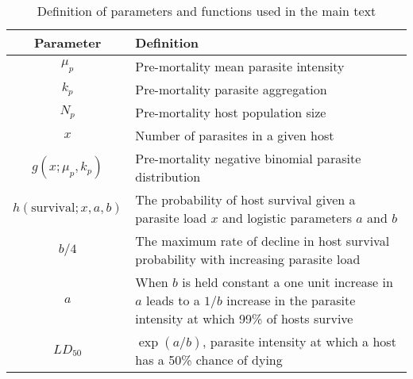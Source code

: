 \documentclass[12pt, a4paper]{article}
\begin{document}
\begin{table}
    \centering
    \caption{Definition of parameters and functions used in the main text}
    \begin{tabular}{c p{12cm}}
    \hline
    Parameter & Definition \\
    \hline\hline
    $\mu_p$ & Pre-mortality mean parasite intensity \\
    $k_p$   & Pre-mortality parasite aggregation \\
    $N_p$   & Pre-mortality host population size \\
    $x$     & Number of parasites in a given host \\
    $g(x; \mu_p, k_p)$ & Pre-mortality negative binomial parasite distribution \\

    $h(\text{survival}; x, a, b)$ & The probability of host survival given a parasite load $x$ and logistic parameters $a$ and $b$\\

    $b / 4$ & The maximum rate of decline in host survival probability with increasing parasite load  \\
    $a$ & When $b$ is held constant a one unit increase in $a$ leads to a $1 / b$ increase in the parasite intensity at which 99\% of hosts survive\\
    $LD_{50}$ & $\exp(a / b)$, parasite intensity at which a host has a 50\% chance of dying \\

    \end{tabular}
    \label{tab:params}
\end{table}
\end{document}
